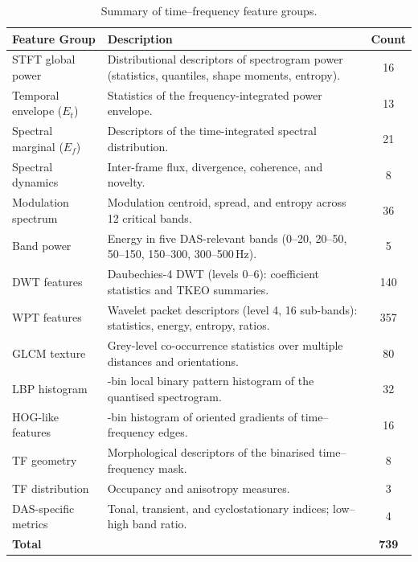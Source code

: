 \begin{table}[!htbp]
	\centering
	\caption{Summary of time--frequency feature groups.}
	\label{tab:tffeatures}
	\small
	\begin{tabularx}{\textwidth}{@{}>{\raggedright\arraybackslash}p{3.6cm} >{\raggedright\arraybackslash}X c@{}}
		\toprule
		\textbf{Feature Group} & \textbf{Description} & \textbf{Count}\\
		\midrule
		STFT global power      & Distributional descriptors of spectrogram power (statistics, quantiles, shape moments, entropy). & 16\\
		Temporal envelope ($E_t$) & Statistics of the frequency-integrated power envelope. & 13\\
		Spectral marginal ($E_f$) & Descriptors of the time-integrated spectral distribution. & 21\\
		Spectral dynamics      & Inter-frame flux, divergence, coherence, and novelty. & 8\\
		Modulation spectrum    & Modulation centroid, spread, and entropy across 12 critical bands. & 36\\
		Band power             & Energy in five DAS-relevant bands (0--20, 20--50, 50--150, 150--300, 300--500\,Hz). & 5\\
		DWT features           & Daubechies-4 DWT (levels 0--6): coefficient statistics and TKEO summaries. & 140\\
		WPT features           & Wavelet packet descriptors (level 4, 16 sub-bands): statistics, energy, entropy, ratios. & 357\\
		GLCM texture           & Grey-level co-occurrence statistics over multiple distances and orientations. & 80\\
		LBP histogram          & 32-bin local binary pattern histogram of the quantised spectrogram. & 32\\
		HOG-like features      & 16-bin histogram of oriented gradients of time--frequency edges. & 16\\
		TF geometry            & Morphological descriptors of the binarised time--frequency mask. & 8\\
		TF distribution        & Occupancy and anisotropy measures. & 3\\
		DAS-specific metrics   & Tonal, transient, and cyclostationary indices; low--high band ratio. & 4\\
		\midrule
		\textbf{Total}         & & \textbf{739}\\
		\bottomrule
	\end{tabularx}
\end{table}

